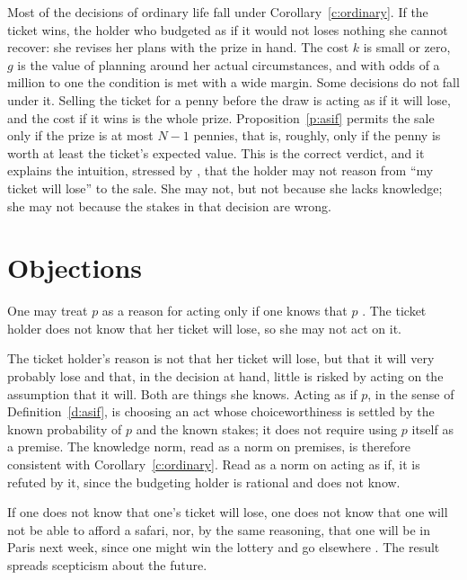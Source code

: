 \documentclass{situationist-preprint}
\begin{document}
Most of the decisions of ordinary life fall under Corollary~\ref{c:ordinary}. If the ticket wins, the holder who budgeted as if it would not loses nothing she cannot recover: she revises her plans with the prize in hand. The cost $k$ is small or zero, $g$ is the value of planning around her actual circumstances, and with odds of a million to one the condition is met with a wide margin. Some decisions do not fall under it. Selling the ticket for a penny before the draw is acting as if it will lose, and the cost if it wins is the whole prize. Proposition~\ref{p:asif} permits the sale only if the prize is at most $N-1$ pennies, that is, roughly, only if the penny is worth at least the ticket's expected value. This is the correct verdict, and it explains the intuition, stressed by \citet{Hawthorne2004}, that the holder may not reason from \enquote{my ticket will lose} to the sale. She may not, but not because she lacks knowledge; she may not because the stakes in that decision are wrong.

\section{Objections}

\begin{objection}
One may treat $p$ as a reason for acting only if one knows that $p$ \citep{HawthorneStanley2008}. The ticket holder does not know that her ticket will lose, so she may not act on it.
\end{objection}

\begin{reply}
The ticket holder's reason is not that her ticket will lose, but that it will very probably lose and that, in the decision at hand, little is risked by acting on the assumption that it will. Both are things she knows. Acting as if $p$, in the sense of Definition~\ref{d:asif}, is choosing an act whose choiceworthiness is settled by the known probability of $p$ and the known stakes; it does not require using $p$ itself as a premise. The knowledge norm, read as a norm on premises, is therefore consistent with Corollary~\ref{c:ordinary}. Read as a norm on acting as if, it is refuted by it, since the budgeting holder is rational and does not know.
\end{reply}

\begin{objection}
If one does not know that one's ticket will lose, one does not know that one will not be able to afford a safari, nor, by the same reasoning, that one will be in Paris next week, since one might win the lottery and go elsewhere \citep{Vogel1990,Hawthorne2004}. The result spreads scepticism about the future.
\end{objection}
\end{document}
